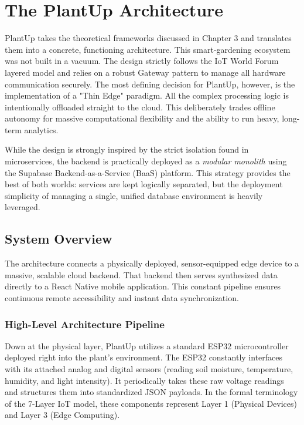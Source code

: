 \section{The PlantUp Architecture}

PlantUp takes the theoretical frameworks discussed in Chapter 3 and translates them into a concrete, functioning architecture. This smart-gardening ecosystem was not built in a vacuum. The design strictly follows the IoT World Forum layered model and relies on a robust Gateway pattern to manage all hardware communication securely. The most defining decision for PlantUp, however, is the implementation of a "Thin Edge" paradigm. All the complex processing logic is intentionally offloaded straight to the cloud. This deliberately trades offline autonomy for massive computational flexibility and the ability to run heavy, long-term analytics.

While the design is strongly inspired by the strict isolation found in microservices, the backend is practically deployed as a \textit{modular monolith} using the Supabase Backend-as-a-Service (BaaS) platform. This strategy provides the best of both worlds: services are kept logically separated, but the deployment simplicity of managing a single, unified database environment is heavily leveraged.

\subsection{System Overview}

The architecture connects a physically deployed, sensor-equipped edge device to a massive, scalable cloud backend. That backend then serves synthesized data directly to a React Native mobile application. This constant pipeline ensures continuous remote accessibility and instant data synchronization.

\subsubsection{High-Level Architecture Pipeline}

Down at the physical layer, PlantUp utilizes a standard ESP32 microcontroller deployed right into the plant's environment. The ESP32 constantly interfaces with its attached analog and digital sensors (reading soil moisture, temperature, humidity, and light intensity). It periodically takes these raw voltage readings and structures them into standardized JSON payloads. In the formal terminology of the 7-Layer IoT model, these components represent Layer 1 (Physical Devices) and Layer 3 (Edge Computing). 

